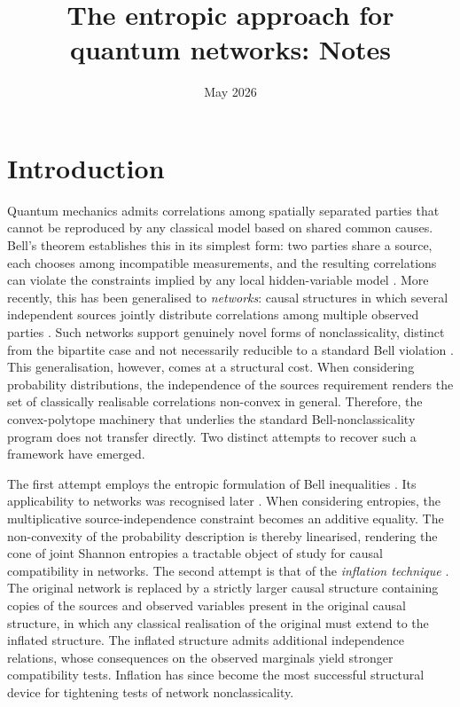 \documentclass[reprint,pra, twocolumn, amsmath,amssymb,
 aps,superscriptaddress,]{revtex4-2}
\date{May 2026}
\begin{document}
\title{The entropic approach for quantum networks: Notes}

\author{}
\email{}
\affiliation{}

\maketitle
\onecolumngrid
\section{Introduction}
Quantum mechanics admits correlations among spatially separated parties that cannot be reproduced by any classical model based on shared common causes.
Bell's theorem establishes this in its simplest form: two parties share a source, each chooses among incompatible measurements, and the resulting correlations can violate the constraints implied by any local hidden-variable model \cite{Bell64}.
More recently, this has been generalised to \emph{networks}: causal structures in which several independent sources jointly distribute correlations among multiple observed parties \cite{HensonLalPusey,Fritz,Branciard2010Bilocality}.
Such networks support genuinely novel forms of nonclassicality, distinct from the bipartite case and not necessarily reducible to a standard Bell violation \cite{Renou2019triangle}. 
This generalisation, however, comes at a structural cost.
When considering probability distributions, the independence of the sources requirement renders the set of classically realisable correlations non-convex in general.
Therefore, the convex-polytope machinery that underlies the standard Bell-nonclassicality program does not transfer directly.
Two distinct attempts to recover such a framework have emerged.


The first attempt employs the entropic formulation of Bell inequalities \cite{BraunsteinCaves88,CerfAdami97}.
Its applicability to networks was recognised later \cite{FritzChaves13,ChavesLuftGross14,WeilenmannColbeck17}.
When considering entropies, the multiplicative source-independence constraint becomes an additive equality.
The non-convexity of the probability description is thereby linearised, rendering the cone of joint Shannon entropies a tractable object of study for causal compatibility in networks.
The second attempt is that of the \emph{inflation technique} \cite{WolfeSpekkensFritz19}.
The original network is replaced by a strictly larger causal structure containing copies of the sources and observed variables present in the original causal structure, in which any classical realisation of the original must extend to the inflated structure.
The inflated structure admits additional independence relations, whose consequences on the observed marginals yield stronger compatibility tests.
Inflation has since become the most successful structural device for tightening tests of network nonclassicality.
\end{document}
